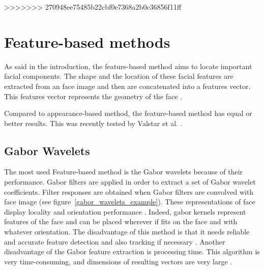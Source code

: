 >>>>>>> 270948ee75485b22cbf0e7368a2b0c36856f11ff
\section{Feature-based methods}

\noindent As said in the introduction, the feature-based method aims to locate important facial components. The shape and the location of these facial features are extracted from an face image and then are concatenated into a features vector. This features vector represents the geometry of the face \cite{SHA09}.
\newline

\noindent Compared to appearance-based method, the feature-based method has equal or better results. This was recently tested by Valstar et al. \cite{VAL05} \cite{VAL06}.
\newline

\subsection{Gabor Wavelets}

\vspace{\baselineskip}
\noindent The most used Feature-based method is the Gabor wavelets because of their performance. Gabor filters are applied in order to extract a set of Gabor wavelet coefficients. Filter responses are obtained when Gabor filters are convolved with face image (see figure~\ref{gabor_wavelets_example}). These representations of face display locality and orientation performance \cite{JEM09}. Indeed, gabor kernels represent features of the face and can be placed wherever if fits on the face and with whatever orientation. The disadvantage of this method is that it needs reliable and accurate feature detection and also tracking if necessary \cite{SHA09}. Another disadvantage of the Gabor feature extraction is processing time. This algorithm is very time-consuming, and dimensions of resulting vectors are very large \cite{PRA09}.
\newline

